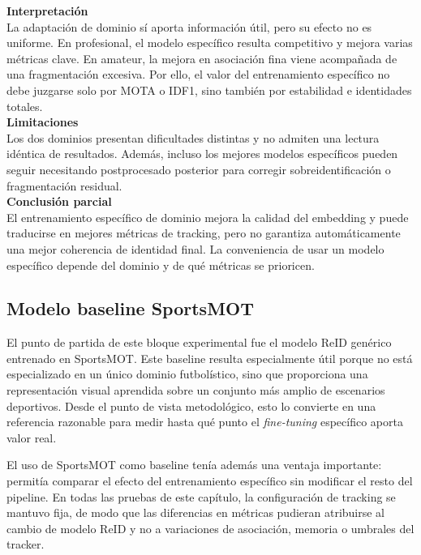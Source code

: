 \documentclass[../MAIN.tex]{subfiles}
\begin{document}
\begin{chaptertemplatebox}
		\textbf{Interpretación}\\
		La adaptación de dominio sí aporta información útil, pero su efecto no es uniforme. En profesional, el modelo específico resulta competitivo y mejora varias métricas clave. En amateur, la mejora en asociación fina viene acompañada de una fragmentación excesiva. Por ello, el valor del entrenamiento específico no debe juzgarse solo por MOTA o IDF1, sino también por estabilidad e identidades totales.\\[0.5em]
		
		\textbf{Limitaciones}\\
		Los dos dominios presentan dificultades distintas y no admiten una lectura idéntica de resultados. Además, incluso los mejores modelos específicos pueden seguir necesitando postprocesado posterior para corregir sobreidentificación o fragmentación residual.\\[0.5em]
		
		\textbf{Conclusión parcial}\\
		El entrenamiento específico de dominio mejora la calidad del embedding y puede traducirse en mejores métricas de tracking, pero no garantiza automáticamente una mejor coherencia de identidad final. La conveniencia de usar un modelo específico depende del dominio y de qué métricas se prioricen.
	\end{chaptertemplatebox}
	
	\subsection{Modelo baseline SportsMOT}
	
	El punto de partida de este bloque experimental fue el modelo ReID genérico entrenado en SportsMOT. Este baseline resulta especialmente útil porque no está especializado en un único dominio futbolístico, sino que proporciona una representación visual aprendida sobre un conjunto más amplio de escenarios deportivos. Desde el punto de vista metodológico, esto lo convierte en una referencia razonable para medir hasta qué punto el \textit{fine-tuning} específico aporta valor real.
	
	El uso de SportsMOT como baseline tenía además una ventaja importante: permitía comparar el efecto del entrenamiento específico sin modificar el resto del pipeline. En todas las pruebas de este capítulo, la configuración de tracking se mantuvo fija, de modo que las diferencias en métricas pudieran atribuirse al cambio de modelo ReID y no a variaciones de asociación, memoria o umbrales del tracker.
	
\end{document}
